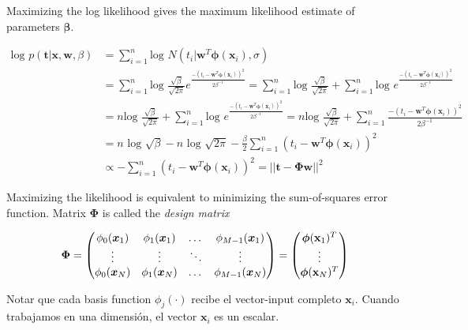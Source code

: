 Maximizing the log likelihood gives the maximum likelihood estimate of parameters $\bm{\beta}$.

\begin{equation}\label{eq:maximum_likelihood}
 \begin{split}
   \text{log } p(\bm{t} | \bm{x}, \bm{w}, \beta) & = \sum_{i=1}^{n} \text{log } N(t_i | \bm{w}^T \bm{\phi}(\bm{x}_i), \sigma)  \\
  & =  \sum_{i=1}^{n} \text{log }  \frac{\sqrt{\beta} }{\sqrt{2\pi}} e^{\frac{-(t_i - \bm{w}^T\bm{\phi}(\bm{x}_i))^2}{2\beta^{-1}} } = \sum_{i=1}^{n} \text{log } \frac{\sqrt{\beta} }{\sqrt{2\pi}} + \sum_{i=1}^{n} \text{log } e^{\frac{-(t_i - \bm{w}^T\bm{\phi}(\bm{x}_i))^2}{2\beta^{-1}} } \\
  & = n \text{log } \frac{\sqrt{\beta} }{\sqrt{2\pi}} + \sum_{i=1}^{n} \text{log } e^{\frac{-(t_i - \bm{w}^T\bm{\phi}(\bm{x}_i))^2}{2\beta^{-1}} } = n \text{log } \frac{\sqrt{\beta} }{\sqrt{2\pi}} + \sum_{i=1}^{n}  \frac{-(t_i - \bm{w}^T\bm{\phi}(\bm{x}_i))^2}{2\beta^{-1}} \\
   &  = n \text{ log } \sqrt{\beta} - n \text{ log } \sqrt{2\pi} - \frac{\beta}{2} \sum_{i=1}^{n}  (t_i - \bm{w}^T\bm{\phi}(\bm{x}_i))^2   \\
  & \propto  - \sum_{i=1}^{n}  (t_i - \bm{w}^T\bm{\phi}(\bm{x}_i))^2 = ||\bm{t}-\bm{\Phi}\bm{w}||^2
 \end{split}
\end{equation}

Maximizing the likelihood is equivalent to minimizing the sum-of-squares error function.
Matrix $\bm{\Phi}$ is called the \emph{design matrix}

\begin{equation}
 \bm{\Phi} =
  \begin{pmatrix}
    \phi_0(\bm{x}_1) & \phi_1(\bm{x}_1) & \dots & \phi_{M-1}(\bm{x}_1)\\
    \vdots & \vdots & \ddots & \vdots \\
    \phi_0(\bm{x}_N) & \phi_1(\bm{x}_N) & \dots & \phi_{M-1}(\bm{x}_N)
  \end{pmatrix}
  = 
  \begin{pmatrix}
   \bm{\phi}(\mathbf{x}_1)^T \\
   \vdots \\
   \bm{\phi}(\mathbf{x}_N)^T \\
  \end{pmatrix}
\end{equation}

Notar que cada basis function $\phi_j(\cdot)$ recibe el vector-input completo $\bm{x}_i$.
Cuando trabajamos en una dimensi\'on, el vector $\bm{x}_i$ es un escalar.



% 



